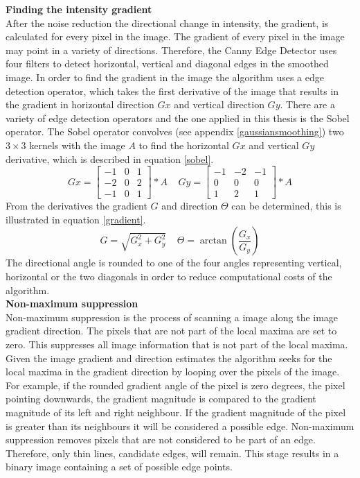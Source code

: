 \documentclass[a4paper]{article}
\begin{document}
\noindent\textbf{Finding the intensity gradient}\\
After the noise reduction the directional change in intensity, the gradient, is calculated for every pixel  in the image. The gradient of every pixel in the image may point in a variety of directions. Therefore, the Canny Edge Detector uses four filters to detect horizontal, vertical and diagonal edges in the smoothed image. In order to find the gradient in the image the algorithm uses a edge detection operator, which takes the first derivative of the image that results in the gradient in horizontal direction $Gx$ and vertical direction $Gy$. There are a variety of edge detection operators and the one applied in this thesis is the Sobel operator. The Sobel operator convolves (see appendix \ref{gaussiansmoothing}) two $3\times3$ kernels with the image $A$ to find the horizontal $Gx$ and vertical  $Gy$ derivative, which is described in equation \ref{sobel}.
\begin{equation}
\label{sobel}
Gx =
\begin{bmatrix}
-1 & 0 & 1\\
-2 & 0 & 2\\
-1 & 0 & 1
\end{bmatrix}
* A\ \ \ \ \ 
Gy =
\begin{bmatrix}
-1 & -2 & -1\\
0 & 0 & 0\\
1 & 2 & 1
\end{bmatrix}
* A
\end{equation}
From the derivatives the gradient $G$ and direction $\Theta$ can be determined, this is illustrated in equation \ref{gradient}.
\begin{equation}
\label{gradient}
G = \sqrt{G_x^2  + G_y^2}\ \ \ \ \ 
\Theta = \arctan(\frac{G_x}{G_y})
\end{equation}
The directional angle is rounded to one of the four angles representing vertical, horizontal or the two diagonals in order to reduce computational costs of the algorithm.\\ 

\noindent\textbf{Non-maximum suppression}\\
Non-maximum suppression is the process of scanning a image along the image gradient direction. The pixels that are not part of the local maxima are set to zero. This suppresses all image information that is not part of the local maxima. Given the image gradient and direction estimates the algorithm seeks for the local maxima in the gradient direction by looping over the pixels of the image. For example, if the rounded gradient angle of the pixel is zero degrees, the pixel pointing downwards, the gradient magnitude is compared to the gradient magnitude of its left and right neighbour. If the gradient magnitude of the pixel is greater than its neighbours it will be considered a possible edge. Non-maximum suppression removes pixels that are not considered to be part of an edge. Therefore, only thin lines, candidate edges, will remain. This stage results in a binary image containing a set of possible edge points.\\
\end{document}
